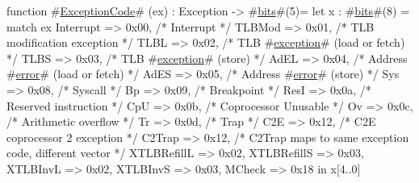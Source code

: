 function #\hyperref[zExceptionCode]{ExceptionCode}# (ex) : Exception -> #\hyperref[zbits]{bits}#(5)=
   let x : #\hyperref[zbits]{bits}#(8) = match ex
   {
      Interrupt    => 0x00, /* Interrupt */
      TLBMod       => 0x01, /* TLB modification exception */
      TLBL         => 0x02, /* TLB #\hyperref[zexception]{exception}# (load or fetch) */
      TLBS         => 0x03, /* TLB #\hyperref[zexception]{exception}# (store) */
      AdEL         => 0x04, /* Address #\hyperref[zerror]{error}# (load or fetch) */
      AdES         => 0x05, /* Address #\hyperref[zerror]{error}# (store) */
      Sys          => 0x08, /* Syscall */
      Bp           => 0x09, /* Breakpoint */
      ResI         => 0x0a, /* Reserved instruction */
      CpU          => 0x0b, /* Coprocessor Unusable */
      Ov           => 0x0c, /* Arithmetic overflow */
      Tr           => 0x0d, /* Trap */
      C2E          => 0x12, /* C2E coprocessor 2 exception */
      C2Trap       => 0x12, /* C2Trap maps to same exception code, different vector */
      XTLBRefillL  => 0x02,
      XTLBRefillS  => 0x03,
      XTLBInvL     => 0x02,
      XTLBInvS     => 0x03,
      MCheck       => 0x18
   } in x[4..0]
